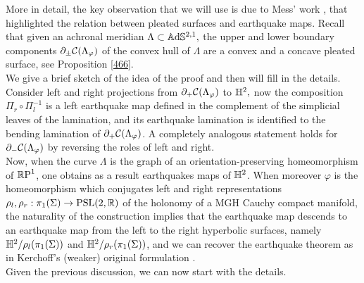 More in detail, the key observation that we will use is due to Mess' work \cite{Mess}, that highlighted the relation between pleated surfaces and earthquake maps. Recall that given an achronal meridian $\Lambda\subset\A^{2,1},$ the upper and lower boundary components $\partial_{\pm}\CF$ of the convex hull of $\Lambda$ are a convex and a concave pleated surface, see Proposition \ref{466}.\\
We give a brief sketch of the idea of the proof and then will fill in the details. Consider left and right projections from $\partial_+\CF$ to $\H^2,$ now the composition $\Pi_r\circ\Pi_l^{-1}$  is a left earthquake map defined in the complement of the simplicial leaves of the lamination, and its earthquake lamination is identified to the bending lamination of $\partial_{+}\CF$. A completely analogous statement holds for $\partial_{-}\CF$ by reversing the roles of left and right.\\  
Now, when the curve $\Lambda$ is the graph of an orientation-preserving homeomorphism of $\S$, one obtains as a result earthquakes maps of $\H^2$. When moreover $\varphi$ is the homeomorphism which conjugates left and right representations $\rho_l,\rho_r:\pi_1(\Sigma)\to\PSL$ of the holonomy of a MGH Cauchy compact manifold, the naturality of the construction implies that the earthquake map descends to an earthquake map from the left to the right hyperbolic surfaces, namely $\H^2/\rho_l(\pi_1(\Sigma))$ and $\H^2/\rho_r(\pi_1(\Sigma))$, and we can recover the earthquake theorem as in Kerchoff's (weaker) original formulation \cite{kerckhoff1983nielsen}.\\
Given the previous discussion, we can now start with the details.



